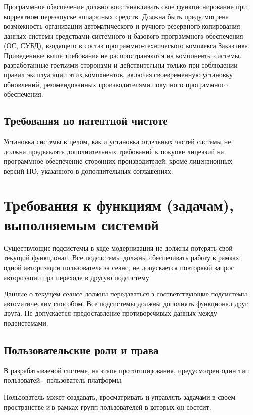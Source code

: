Программное обеспечение должно восстанавливать свое функционирование при корректном перезапуске аппаратных средств. Должна быть предусмотрена возможность организации автоматического и ручного резервного копирования данных системы средствами системного и базового программного обеспечения (ОС, СУБД), входящего в состав программно-технического комплекса Заказчика. Приведенные выше требования не распространяются на компоненты системы, разработанные третьими сторонами и действительны только при соблюдении правил эксплуатации этих компонентов, включая своевременную установку обновлений, рекомендованных производителями покупного программного обеспечения.

\subsection{Требования по патентной чистоте}

Установка системы в целом, как и установка отдельных частей системы не должна предъявлять дополнительных требований к покупке лицензий на программное обеспечение сторонних производителей, кроме лицензионных версий ПО, указанного в дополнительных соглашениях.

\section{Требования к функциям (задачам), выполняемым системой}

Существующие подсистемы в ходе модернизации не должны потерять свой текущий функционал. Все подсистемы должны обеспечивать работу в рамках одной авторизации пользователя за сеанс, не допускается повторный запрос авторизации при переходе в другую подсистему.

Данные о текущем сеансе должны передаваться в соответствующие подсистемы автоматическим способом. Все подсистемы должны дополнять функционал друг друга. Не допускается предоставление противоречивых данных между подсистемами.

\subsection{Пользовательские роли и права}

В разрабатываемой системе, на этапе прототипирования, предусмотрен один тип пользоватей - пользователь платформы.

Пользователь может создавать, просматривать и управлять задачами в своем пространстве и в рамках групп пользователей в которых он состоит.


